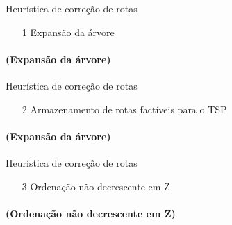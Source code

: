 \documentclass[12pt]{beamer}
\begin{document}

\begin{frame}{Heur\'istica de corre\c{c}\~ao de rotas}
	\begin{enumerate}
		\item[1] Expans\~ao da \'arvore 
	\end{enumerate}
	\framesubtitle{(Expans\~ao da \'arvore)}
	\begin{figure}
  \end{figure}
\end{frame}

\begin{frame}{Heur\'istica de corre\c{c}\~ao de rotas}
	\begin{enumerate}
		\item[2] Armazenamento de rotas fact\'iveis para o TSP 
	\end{enumerate}
	\framesubtitle{(Expans\~ao da \'arvore)}
	\begin{figure}
	\end{figure}
\end{frame}

\begin{frame}{Heur\'istica de corre\c{c}\~ao de rotas}
	\begin{enumerate}
		\item[3] Ordena\c{c}\~ao n\~ao decrescente em Z 
	\end{enumerate}
	\framesubtitle{(Ordena\c{c}\~ao n\~ao decrescente em Z)}
	\begin{figure}
	\end{figure}
\end{frame}
\end{document}
